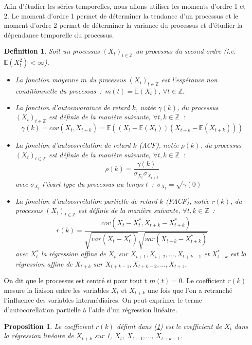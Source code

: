 \documentclass[11pt]{scrartcl} %
\newtheorem{Def}[theorem]{Definition}
\newtheorem{pro}[theorem]{Proposition}
\newcommand{\Xt}{\left(X_t\right)_{t\in\mathbb{Z}}}
\newcommand{\Z}{\mathbb{Z}}
\newcommand{\E}[1]{\mathbb{E}\left(#1\right)}
\begin{document}
Afin d'étudier les séries temporelles, nous allons utiliser les moments d'ordre 1 et 2. Le moment d'ordre 1 permet de déterminer la tendance d'un processus et le moment d'ordre 2 permet de déterminer la variance du processus et d'étudier la dépendance temporelle du processus.
\begin{Def}\label{defMom}
Soit un processus $\Xt$ un processus du second ordre (i.e. $\E{X_t^2}<\infty$).
\begin{itemize}
\item[i)]La fonction moyenne $m$ du processus $\Xt$ est l'espérance non conditionnelle du processus~:~$m(t)=\E{X_t}$, $\forall t\in \Z$.
\item[ii)]La fonction d'autocovaraince de retard $k$, notée $\gamma(k)$, du processus $\Xt$ est définie de la manière suivante, $\forall t, k\in\Z$~:
$$
\gamma(k)=cov\left(X_t,X_{t+k}\right)=\E{\left(X_t-\E{X_t}\right)\left(X_{t+k}-\E{X_{t+k}}\right)}
$$
\item[iii)]La fonction d'autocorrélation de retard $k$ (ACF), notée $\rho(k)$, du processus $\Xt$ est définie de la manière suivante, $\forall t, k\in\Z$~:
$$
\rho(k)=\frac{\gamma(k)}{\sigma_{X_t}\sigma_{X_{t+k}}}
$$
avec $\sigma_{X_t}$ l'écart type du processus au temps $t$~:~$\sigma_{X_t}=\sqrt{\gamma(0)}$
\item[iv)]La fonction d'autocorrélation partielle de retard $k$ (PACF), notée $r(k)$, du processus $\Xt$ est définie de la manière suivante, $\forall t, k\in\Z$~:
$$
r(k)=\frac{cov(X_t-X_t^*,X_{t+k}-X_{t+k}^*)}{\sqrt{var(X_t-X_t^*)}\sqrt{var(X_{t+k}-X_{t+k}^*)}}
$$
avec $X_t^*$ la régression affine de $X_t$ sur $X_{t+1},X_{t+2},..., X_{t+k-1}$ et $X^*_{t+k}$ est la régression affine de $X_{t+k}$ sur $X_{t+k-1},X_{t+k-2},...,X_{t+1}$.
\end{itemize}
\end{Def}
On dit que le processus est centré si pour tout t $m(t)=0$. Le coefficient $r(k)$ mesure la liaison entre les variables $X_t$ et $X_{t+k}$ une fois que l'on a retranché l'influence des variables intermédiaires. On peut exprimer le terme d'autocorellation partielle à l'aide d'un régression linéaire.
\begin{pro}
Le coefficient $r(k)$ définit dans (\ref{defMom}) est le coefficient de $X_t$ dans la régression linéaire de $X_{t+k}$ sur 1, $X_t$, $X_{t+1}$,..., $X_{t+k-1}$.
\end{pro}
\end{document}
